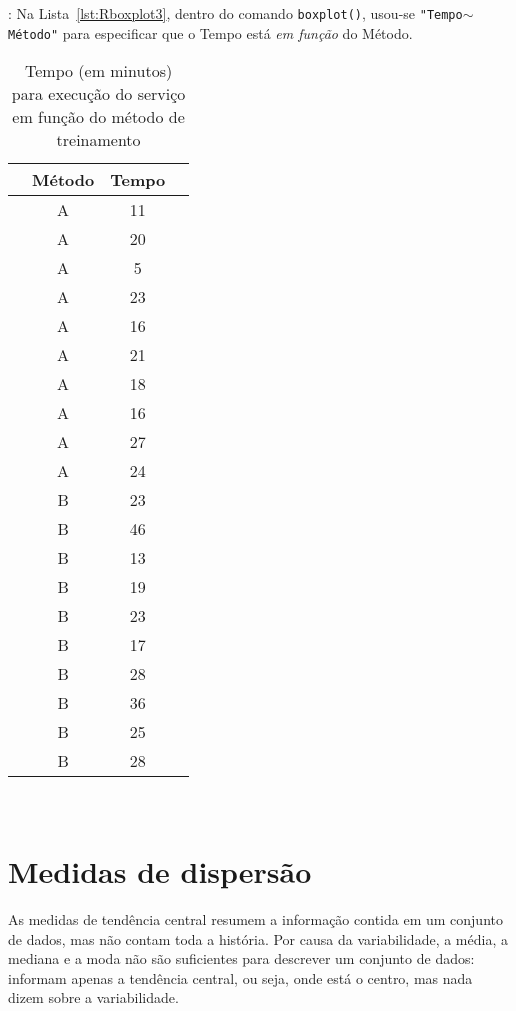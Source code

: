 \documentclass[11pt,fleqn]{book} %
\begin{document}
: Na Lista~\ref{lst:Rboxplot3}, dentro do comando \texttt{boxplot()}, usou-se \texttt{"Tempo$\sim$Método"} para especificar que o Tempo está {\itshape em função} do Método. \\

\begin{table}[h]
	\caption{Tempo (em minutos) para execução do serviço em função do método de treinamento}
	\label{tab:boxplotcomp2} 
	\vspace{-0.1cm}
	\centering
	\begin{tabular}{c c c c}
	\toprule
	& \textbf{Método} & \textbf{Tempo} & \\
	\midrule
	& A & 11 \\
	& A & 20 \\
	& A &  5 \\
	& A & 23 \\
	& A & 16 \\
	& A & 21 \\
	& A & 18 \\
	& A & 16 \\
	& A & 27 \\
	& A & 24 \\
	& B & 23 \\
	& B & 46 \\
	& B & 13 \\
	& B & 19 \\
	& B & 23 \\
	& B & 17 \\
	& B & 28 \\
	& B & 36 \\
	& B & 25 \\
	& B & 28 \\
	\bottomrule
	\end{tabular} \\
\end{table}






\chapter{Medidas de dispersão}


As medidas de tendência central resumem a informação contida em um conjunto de dados, mas não contam toda a história. Por causa da variabilidade, a média, a mediana e a moda não são suficientes para descrever um conjunto de dados: informam apenas a tendência central, ou seja, onde está o centro, mas nada dizem sobre a variabilidade. \\
\end{document}
